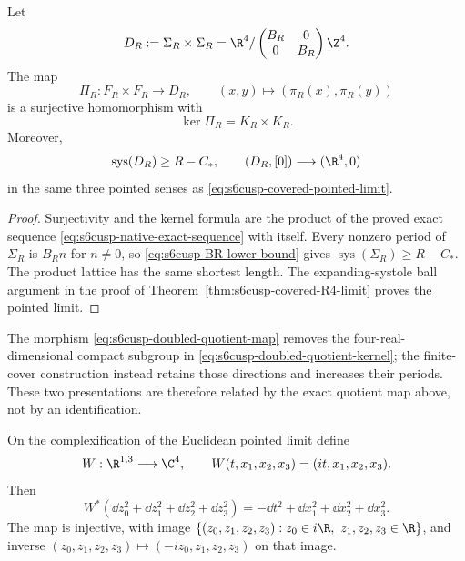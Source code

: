 \begin{proposition}
\label{prop:s6cusp-doubled-quotient}
Let
\[
 D_R:=\Sigma_R\times\Sigma_R
 =\R^4/
 \begin{pmatrix}B_R&0\\0&B_R\end{pmatrix}\Z^4.
\]
The map
\begin{equation}\label{eq:s6cusp-doubled-quotient-map}
 \Pi_R:F_R\times F_R\longrightarrow D_R,
 \qquad
 (x,y)\longmapsto(\pi_R(x),\pi_R(y))
\end{equation}
is a surjective homomorphism with
\begin{equation}\label{eq:s6cusp-doubled-quotient-kernel}
 \ker\Pi_R=K_R\times K_R.
\end{equation}
Moreover,
\[
 \operatorname{sys}(D_R)\ge R-C_*,
 \qquad
 (D_R,[0])\longrightarrow(\R^4,0)
\]
in the same three pointed senses as
\eqref{eq:s6cusp-covered-pointed-limit}.
\end{proposition}

\begin{proof}
Surjectivity and the kernel formula are the product of the proved exact
sequence \eqref{eq:s6cusp-native-exact-sequence} with itself.  Every
nonzero period of \(\Sigma_R\) is \(B_Rn\) for \(n\ne0\), so
\eqref{eq:s6cusp-BR-lower-bound} gives
\(\operatorname{sys}(\Sigma_R)\ge R-C_*\).  The product lattice has the
same shortest length.  The expanding-systole ball argument in the proof of
Theorem~\ref{thm:s6cusp-covered-R4-limit} proves the pointed limit.
\end{proof}

The morphism \eqref{eq:s6cusp-doubled-quotient-map} removes the four-real-
dimensional compact subgroup in
\eqref{eq:s6cusp-doubled-quotient-kernel}; the finite-cover construction
instead retains those directions and increases their periods.  These two
presentations are therefore related by the exact quotient map above, not
by an identification.

\begin{proposition}
\label{prop:s6cusp-local-wick-map}
On the complexification of the Euclidean pointed limit define
\[
 W:\R^{1,3}\longrightarrow\C^4,\qquad
 W(t,x_1,x_2,x_3)=(it,x_1,x_2,x_3).
\]
Then
\begin{equation}\label{eq:s6cusp-wick-pullback}
 W^*\left(\dd z_0^2+\dd z_1^2+\dd z_2^2+\dd z_3^2\right)
 =-\dd t^2+\dd x_1^2+\dd x_2^2+\dd x_3^2.
\end{equation}
The map is injective, with image
\(\{(z_0,z_1,z_2,z_3):z_0\in i\R,\ z_1,z_2,z_3\in\R\}\), and inverse
\((z_0,z_1,z_2,z_3)\mapsto(-iz_0,z_1,z_2,z_3)\) on that image.
\end{proposition}

